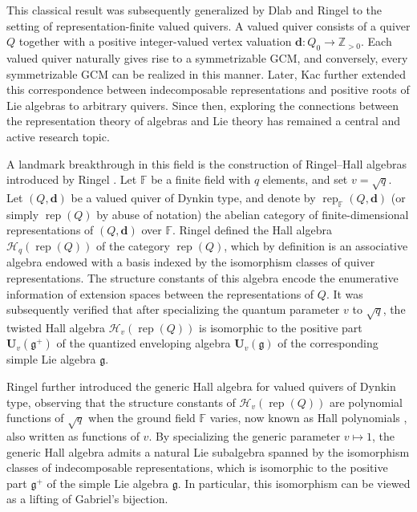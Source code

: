 \documentclass[12pt,reqno]{amsart}
\numberwithin{equation}{section}
\newcommand{\rep}{\operatorname{rep}\nolimits}
\begin{document}
	
	
	This classical result was subsequently generalized by Dlab and Ringel \cite{DR75} to the setting of representation-finite valued quivers. A valued quiver consists of a quiver $Q$ together with a positive integer-valued vertex valuation $\mathbf{d}\colon Q_0\rightarrow\mathbb{Z}_{>0}$. Each valued quiver naturally gives rise to a symmetrizable GCM, and conversely, every symmetrizable GCM can be realized in this manner. Later,  
	Kac \cite{Kac80} further extended this correspondence between indecomposable representations and positive roots of Lie algebras to arbitrary quivers. Since then, exploring the connections between the representation theory of algebras and Lie theory has remained a central and active research topic.
	
	
	
	
	A landmark breakthrough in this field is the construction of Ringel--Hall algebras introduced by Ringel \cite{R90-Hall-poly-rep-fin}. Let $\mathbb{F}$ be a finite field with $q$ elements, and set $v=\sqrt{q}$. Let $(Q,\mathbf{d})$ be a valued quiver of Dynkin type, and denote by $\rep_\mathbb{F}(Q,\mathbf{d})$ (or simply $\rep(Q)$ by abuse of notation) the abelian category of finite-dimensional representations of $(Q,\mathbf{d})$ over $\mathbb{F}$. Ringel defined the Hall algebra $\mathcal{H}_q(\rep(Q))$ of the category $\rep(Q)$, which by definition is an associative algebra endowed with a basis indexed by the isomorphism classes of quiver representations. The structure constants of this algebra encode the enumerative information of  extension spaces between the representations of $Q$. 
	It was subsequently verified that after specializing the quantum parameter $v$ to $\sqrt{q}$, the twisted Hall algebra $\mathcal{H}_v(\rep(Q))$ is isomorphic to the positive part $\mathbf{U}_v(\mathfrak{g}^+)$ of the quantized enveloping algebra $\mathbf{U}_v(\mathfrak{g})$ of the corresponding simple Lie algebra $\mathfrak{g}$.
	
	
	
	Ringel further introduced the generic Hall algebra for valued quivers of Dynkin type, observing that the structure constants of $\mathcal{H}_v(\rep(Q))$ are polynomial functions of $\sqrt{q}$ when the ground field $\mathbb{F}$ varies, now known as Hall polynomials \cite{Rin90}, also written as functions of $v$.
	By specializing the generic parameter $v\mapsto 1$, the generic Hall algebra admits a natural Lie subalgebra spanned by the isomorphism classes of indecomposable representations, which is isomorphic to the positive part $\mathfrak{g}^+$ of the simple Lie algebra $\mathfrak{g}$. In particular, this isomorphism can be viewed as a lifting of Gabriel's bijection. 
	
\end{document}
